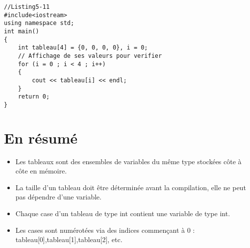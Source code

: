 \documentclass[a4paper, oneside,11pt]{book}
\begin{document}
\begin{lstlisting}
//Listing5-11
#include<iostream>
using namespace std;
int main()
{
    int tableau[4] = {0, 0, 0, 0}, i = 0;
    // Affichage de ses valeurs pour verifier
    for (i = 0 ; i < 4 ; i++)
    {
        cout << tableau[i] << endl;
    }
    return 0;
}
\end{lstlisting} 



\section{En r\'esum\'e}

\begin{itemize}
\item    Les tableaux sont des ensembles de variables du m\^eme type stock\'ees côte \`a côte en m\'emoire.

\item    La taille d'un tableau doit \^etre d\'etermin\'ee avant la compilation, elle ne peut pas d\'ependre d'une variable.

\item    Chaque case d'un tableau de type int contient une variable de type int.

\item    Les cases sont num\'erot\'ees via des indices commençant 
\`a 0 : tableau[0],tableau[1],tableau[2], etc.
\end{itemize}

\color{black}
\end{document}
